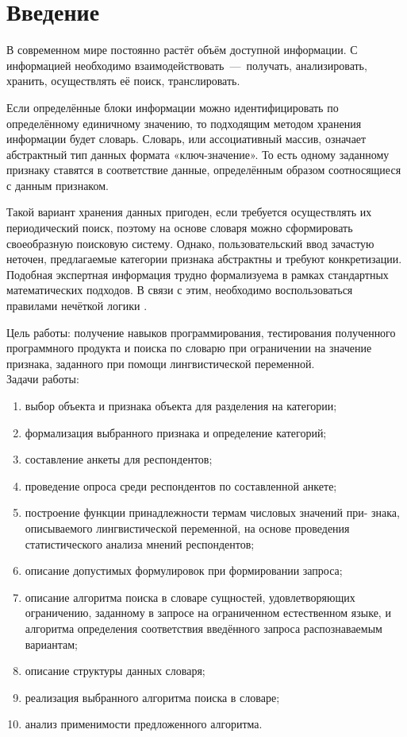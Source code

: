 \setcounter{page}{3}
\chapter*{Введение}
В современном мире постоянно растёт объём доступной информации. С информацией необходимо взаимодействовать~---~получать, анализировать, хранить, осуществлять её поиск, транслировать. 

Если определённые блоки информации можно идентифицировать по определённому единичному значению, то подходящим методом хранения информации будет словарь. Словарь, или ассоциативный массив, означает абстрактный тип данных формата «ключ-значение». То есть одному заданному признаку ставятся в соответствие данные, определённым образом соотносящиеся с данным признаком.

Такой вариант хранения данных пригоден, если требуется осуществлять их периодический поиск, поэтому на основе словаря можно сформировать своеобразную поисковую систему. Однако, пользовательский ввод зачастую неточен, предлагаемые категории признака абстрактны и требуют конкретизации. Подобная экспертная информация трудно формализуема в рамках стандартных математических подходов. В связи с этим, необходимо воспользоваться правилами нечёткой логики \cite{item8}.

Цель работы: получение навыков программирования, тестирования полученного программного продукта и поиска по словарю при ограничении на значение признака, заданного при помощи лингвистической переменной.\\

Задачи работы:
\begin{enumerate}[label={\arabic*)}]
	\item выбор объекта и признака объекта для разделения на категории;
	\item формализация выбранного признака и определение категорий;
	\item составление анкеты для респондентов;
	\item проведение опроса среди респондентов по составленной анкете;
	\item построение функции принадлежности термам числовых значений при- знака, описываемого лингвистической переменной, на основе проведения статистического анализа мнений респондентов;
	\item описание допустимых формулировок при формировании запроса;
	\item описание алгоритма поиска в словаре сущностей, удовлетворяющих ограничению, заданному в запросе на ограниченном естественном языке, и алгоритма определения соответствия введённого запроса распознаваемым вариантам; 
	\item описание структуры данных словаря;
	\item реализация выбранного алгоритма поиска в словаре;
	\item анализ применимости предложенного алгоритма.
\end{enumerate}

\newpage
